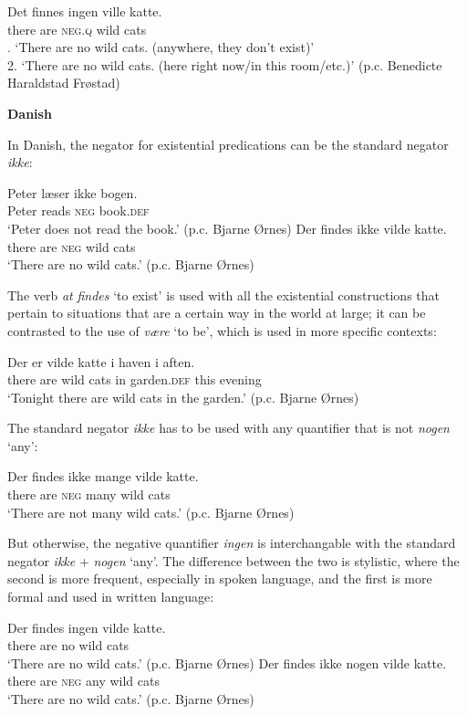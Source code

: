 ﻿\documentclass[output=paper]{langsci/langscibook}
\begin{document}
\begin{unindented}
\begin{exe}\ex\gll  Det   finnes ingen ville katte.\\
there are \textsc{neg.q}  wild cats\\
. `There are no wild cats. (anywhere, they don't exist)’\\
2. `There are no wild cats. (here right now/in this room/etc.)' (p.c. Benedicte Haraldstad Frøstad)
\end{exe}

\textbf{Danish}

In Danish, the negator for existential predications can be the standard negator \textit{ikke}:
%
\begin{exe}\ex \gll Peter læser ikke bogen. \\
Peter reads  \textsc{neg} book.\textsc{def} \\
    \glt `Peter does not read the book.' (p.c. Bjarne Ørnes)
\ex \gll Der findes ikke vilde katte. \\
there are \textsc{neg} wild cats \\
    \glt `There are no wild cats.' (p.c. Bjarne Ørnes)
    \end{exe}

The verb \textit{at} \textit{findes} `to exist' is used with all the existential constructions that pertain to situations that are a certain way in the world at large; it can be contrasted to the use of \textit{være} `to be', which is used in more specific contexts:
%
\begin{exe}\ex \gll Der er vilde katte i haven i aften. \\
there are wild cats in garden.\textsc{def} this evening \\
    \glt `Tonight there are wild cats in the garden.' (p.c. Bjarne Ørnes)
    \end{exe}

The standard negator \textit{ikke} has to be used with any quantifier that is not \textit{nogen} `any':
%
\begin{exe}\ex \gll Der findes ikke mange vilde katte. \\
there are \textsc{neg}  many   wild cats \\
    \glt `There are not many wild cats.' (p.c. Bjarne Ørnes)
    \end{exe}

But otherwise, the negative quantifier \textit{ingen} is interchangable with the standard negator \textit{ikke} + \textit{nogen} `any'. The difference between the two is stylistic, where the second is more frequent, especially in spoken language, and the first is more formal and used in written language:
%
\begin{exe}\ex \gll Der   findes ingen vilde katte. \\
there are no     wild cats \\
    \glt `There are no wild cats.' (p.c. Bjarne Ørnes)
\ex \gll Der   findes ikke nogen vilde katte. \\
there are \textsc{neg}  any  wild cats \\
    \glt `There are no wild cats.' (p.c. Bjarne Ørnes)
    \end{exe}


\end{unindented}
\end{document}
